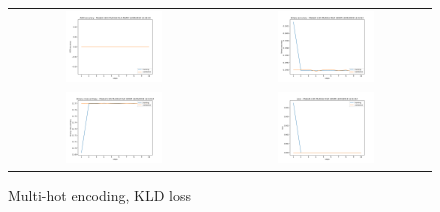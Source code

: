 \begin{appendices}
        \begin{figure}[H]
            \centering
            \begin{tabular}{cc}
                \includegraphics[width=0.48\textwidth]{figures/training_plots/ModelA-(1D)-MultiHot-KLD-ADAM_12-04-2019_12-23-54_AON-accuracy.pdf} & \includegraphics[width=0.48\textwidth]{figures/training_plots/ModelA-(1D)-MultiHot-KLD-ADAM_12-04-2019_12-23-54_binary-accuracy.pdf} \\
                \includegraphics[width=0.48\textwidth]{figures/training_plots/ModelA-(1D)-MultiHot-KLD-ADAM_12-04-2019_12-23-54_binary-cross-entropy.pdf} & \includegraphics[width=0.48\textwidth]{figures/training_plots/ModelA-(1D)-MultiHot-KLD-ADAM_12-04-2019_12-23-54_loss.pdf}
            \end{tabular}
            \caption*{Multi-hot encoding, KLD loss}
        \end{figure}
        

\end{appendices}
